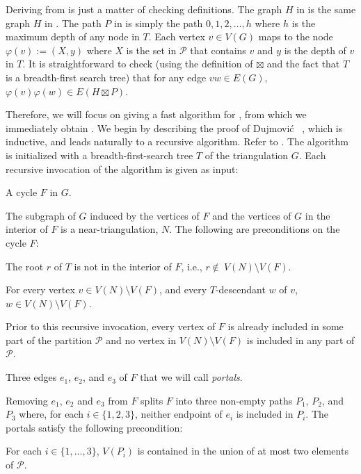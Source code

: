 \documentclass[kpfonts]{patmorin}
\begin{document}
Deriving  from  is just a matter of checking definitions.  The graph $H$ in  is the same graph $H$ in . The path $P$ in  is simply the path $0,1,2,\ldots,h$ where $h$ is the maximum depth of any node in $T$.  Each vertex $v\in V(G)$ maps to the node $\varphi(v):=(X,y)$ where $X$ is the set in $\mathcal{P}$ that contains $v$ and $y$ is the depth of $v$ in $T$.  It is straightforward to check (using the definition of $\boxtimes$ and the fact that $T$ is a breadth-first search tree) that for any  edge $vw\in E(G)$, $\varphi(v)\varphi(w)\in E(H\boxtimes P)$.

Therefore, we will focus on giving a fast algorithm for , from which we immediately obtain .  We begin by describing the proof of Dujmović \etal\  \cite{dujmovic.joret.ea:planar}, which is inductive, and leads naturally to a recursive algorithm.  Refer to . The algorithm is initialized with a breadth-first-search tree $T$ of the triangulation $G$.  Each recursive invocation of the algorithm is given as input:
\begin{compactenum}
  \item A cycle $F$ in $G$.

  The subgraph of $G$ induced by the vertices of $F$ and the vertices of $G$ in the interior of $F$ is a near-triangulation, $N$.  The following are preconditions on the cycle $F$:
  \begin{compactenum}[(P1)]
    \item The root $r$ of $T$ is not in the interior of $F$, i.e., $r\not\in\ V(N)\setminus V(F)$.
    \item For every vertex $v\in V(N)\setminus V(F)$, and every $T$-descendant $w$ of $v$, $w\in V(N)\setminus V(F)$.
    \item Prior to this recursive invocation, every vertex of $F$ is already included in some part of the partition $\mathcal{P}$ and no vertex in $V(N)\setminus V(F)$ is included in any part of $\mathcal{P}$.
  \end{compactenum}
  \item Three edges $e_1$, $e_2$, and $e_3$ of $F$ that we will call \emph{portals}.

  Removing $e_1$, $e_2$ and $e_3$ from $F$ splits $F$ into three non-empty paths $P_1$, $P_2$, and $P_3$ where, for each $i\in\{1,2,3\}$, neither endpoint of $e_i$ is included in $P_i$.  The portals satisfy the following precondition:
  \begin{compactenum}[(P1)]\setcounter{enumii}{3}
    \item For each $i\in\{1,\ldots,3\}$, $V(P_i)$ is contained in the union of at most two elements of $\mathcal{P}$.
  \end{compactenum}

\end{compactenum}
\end{document}
